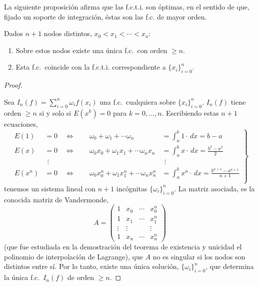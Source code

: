 La siguiente proposición afirma que las f.c.t.i. son óptimas, en el
sentido de que, fijado un soporte de integración, éstas son las f.c.
de mayor orden.
\begin{proposition}
  \label{pro:existencia.fcti}
  Dados $n+1$ nodos distintos, $x_0<x_1<\cdots<x_n$:
  \begin{enumerate}
  \item Sobre estos nodos existe una única f.c.\ con orden $\ge
    n$.
  \item Esta f.c.\ coincide con la f.c.t.i. correspondiente a
    $\{x_i\}_{i=0}^n$.
  \end{enumerate}
\end{proposition}
\begin{proof}~\par
   Sea $I_n(f)=\sum_{i=0}^n \omega_i f(x_i)$ una
  f.c.\ cualquiera sobre $\{x_i\}_{i=0}^n$. $I_n(f)$ tiene orden $\ge
  n$ si y solo si $E(x^k)=0$ para $k=0,\dots,n$. Escribiendo estas $n+1$
  ecuaciones,
  \begin{equation}
    \left.
  \begin{alignedat}{2} %
    E(1)&=0 \quad \Leftrightarrow\ \quad &
    \omega_0 + \omega_1 + \cdots \omega_n &=
    \int_a^b 1\cdot\,dx = b-a
    \\
    E(x)&=0 \quad \Leftrightarrow\ \quad &
    \omega_0 x_0 + \omega_1 x_1 + \cdots \omega_n x_n &=
    \int_a^b x \cdot\,dx = \frac{b^2-a^2}{2}
    \\
    &\ \, \vdots & &\ \, \vdots
    \\
    E(x^n)&=0 \quad \Leftrightarrow\ \quad &
    \omega_0 x_0^n + \omega_1 x_1^n + \cdots \omega_n x_n^n &=
    \int_a^b x^n \cdot\,dx = \frac{b^{n+1}-a^{n+1}}{n+1}
    \\
  \end{alignedat}
  \right\}
  \label{eq:sl.fcti}
\end{equation}
  tenemos un sistema lineal con $n+1$ incógnitas
  $\{\omega_i\}_{i=0}^n$. La matriz asociada, es la conocida matriz de
  Vandermonde,
  \begin{equation*}
    A =
    \begin{pmatrix}
      1 & x_0& \cdots & x_0^n \\
      1 & x_1& \cdots & x_1^n \\
      \vdots & \vdots & & \vdots \\
      1 & x_n& \cdots & x_n^n
    \end{pmatrix}
  \end{equation*}
  (que fue estudiada en la demostración del teorema de existencia y
  unicidad el polinomio de interpolación de Lagrange), que $A$ no es
  singular si los nodos son distintos entre sí.  Por lo tanto, existe
  una única solución, $\{\omega_i\}_{i=0}^n$, que determina la única
  f.c.\ $I_n(f)$ de orden $\ge n$.


\end{proof}
